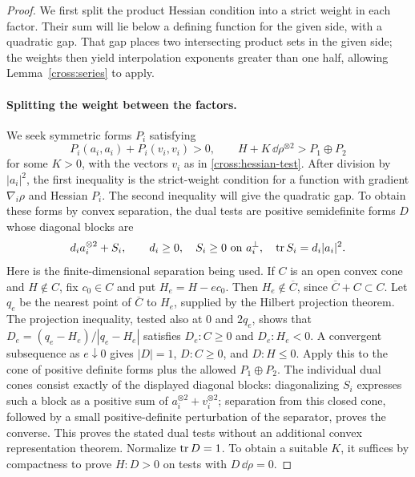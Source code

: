 \begin{proof}
We first split the product Hessian condition into a strict weight in
each factor. Their sum will lie below a defining function for the given
side, with a quadratic gap. That gap places two intersecting product
sets in the given side; the weights then yield interpolation exponents
greater than one half, allowing Lemma~\ref{cross:series} to apply.

\paragraph{Splitting the weight between the factors.}
We seek symmetric forms $P_i$ satisfying
\[
 P_i(a_i,a_i)+P_i(v_i,v_i)>0,
 \qquad H+K\,\dd\rho^{\otimes2}>P_1\oplus P_2
\]
for some $K>0$, with the vectors $v_i$ as in
\eqref{cross:hessian-test}. After division by $|a_i|^2$, the first
inequality is the strict-weight condition for a function with gradient
$\nabla_i\rho$ and Hessian $P_i$. The second inequality will give the
quadratic gap. To obtain these forms by convex separation, the dual
tests are positive semidefinite forms $D$ whose diagonal blocks are
\[
 d_i a_i^{\otimes2}+S_i,\qquad
 d_i\ge0,\quad S_i\ge0\text{ on }a_i^\perp,
 \quad \operatorname{tr} S_i=d_i|a_i|^2.
\]
Here is the finite-dimensional separation being used. If $C$ is an
open convex cone and $H\notin C$, fix $c_0\in C$ and put
$H_e=H-ec_0$. Then $H_e\notin\overline C$, since
$\overline C+C\subset C$. Let $q_e$ be the nearest point of
$\overline C$ to $H_e$, supplied by the Hilbert projection theorem.
The projection inequality, tested also at $0$ and $2q_e$, shows that
$D_e=(q_e-H_e)/|q_e-H_e|$ satisfies $D_e:C\ge0$ and
$D_e:H_e<0$. A convergent subsequence as $e\downarrow0$ gives
$|D|=1$, $D:C\ge0$, and $D:H\le0$. Apply this to the cone of positive
definite forms plus the allowed $P_1\oplus P_2$. The individual dual
cones consist exactly of the displayed diagonal blocks: diagonalizing
$S_i$ expresses such a block as a positive sum of
$a_i^{\otimes2}+v_i^{\otimes2}$; separation from this closed cone,
followed by a small positive-definite perturbation of the separator,
proves the converse. This proves the stated dual tests without an
additional convex representation theorem.
Normalize $\operatorname{tr} D=1$.  To obtain a suitable $K$, it suffices by
compactness to prove $H:D>0$ on tests with $D\,\dd\rho=0$.


\end{proof}
